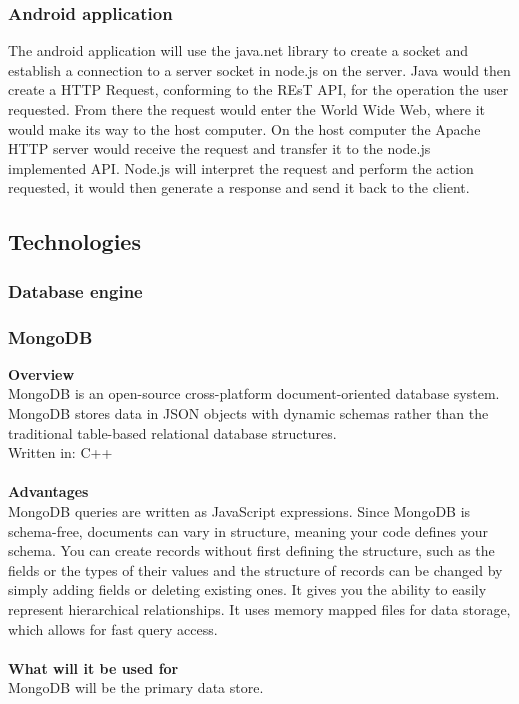 \documentclass{article}
\begin{document}
\subsubsection*{Android application}
The android application will use the java.net library to create a socket and establish a connection to a server socket in node.js on the server. Java would then create a HTTP Request, conforming to the REsT API, for the operation the user requested. From there the request would enter the World Wide Web, where it would make its way to the host computer. On the host computer the Apache HTTP server would receive the request and transfer it to the node.js implemented API. Node.js will interpret the request and perform the action requested, it would then generate a response and send it back to the client.\\


\subsection{Technologies}
\subsubsection{Database engine}
\subsubsection*{MongoDB}
\textbf{Overview}\\
MongoDB is an open-source cross-platform document-oriented database system. MongoDB stores data in JSON objects with dynamic schemas rather than the traditional table-based relational database structures.\\
Written in: C++\\\\
\textbf{Advantages}\\
MongoDB queries are written as JavaScript expressions. Since MongoDB is schema-free, documents can vary in structure, meaning your code defines your schema. You can create records without first defining the structure, such as the fields or the types of their values and the structure of records can be changed by simply adding fields or deleting existing ones. It gives you the ability to easily represent hierarchical relationships. It uses memory mapped files for data storage, which allows for fast query access.\\\\
\textbf{What will it be used for}\\
MongoDB will be the primary data store.
\end{document}
